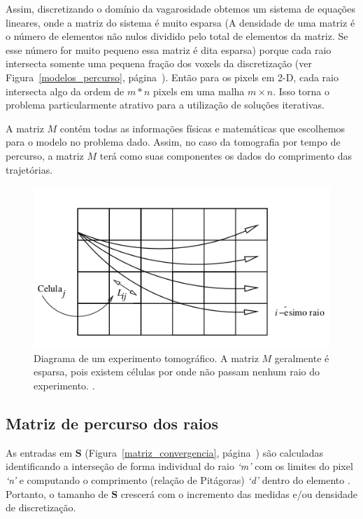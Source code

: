 \documentclass[a4paper, 12 pt]{article} %
\begin{document}
Assim, discretizando o domínio da vagarosidade obtemos um sistema de equações lineares, onde a matriz do sistema é muito esparsa (A densidade de uma matriz é o número de elementos não nulos dividido pelo total de elementos da matriz. Se esse número for muito pequeno essa matriz é dita esparsa) porque cada raio intersecta somente uma pequena fração dos voxels da discretização (ver Figura~\ref{modelos_percurso}, página~\pageref{modelos_percurso}). Então para os pixels em 2-D, cada raio intersecta algo da ordem de $m * n$ pixels em uma malha $m \times n$. Isso torna o problema particularmente atrativo para a utilização de soluções iterativas. 

A matriz $M$ contém todas as informações físicas e matemáticas que escolhemos para o modelo no problema dado. Assim, no caso da tomografia por tempo de percurso, a matriz
$M$ terá como suas componentes os dados do comprimento das trajetórias.

\begin{figure}[!hbtp]
	\begin{center}
		\includegraphics[scale=0.60]{Figuras/diagrama.png}
	\end{center}
	\caption{Diagrama de um experimento tomográfico. A matriz $M$ geralmente é esparsa, pois existem células por onde não passam nenhum raio do experimento. \cite{tempopercurso}.}
	\label{modelos_diagrama}
\end{figure} \newpage


\subsection{Matriz de percurso dos raios}

As entradas em $\textbf{S}$ (Figura~\ref{matriz_convergencia}, página~\pageref{matriz_convergencia}) são calculadas identificando a interseção de forma individual do raio \textit{`m'} com os limites do pixel \textit{`n'} e computando o comprimento (relação de Pitágoras) \textit{`d'} dentro do elemento \citep{RBGf1495}. Portanto, o tamanho de $\textbf{S}$ crescerá com o incremento das medidas e/ou densidade de discretização.
\end{document}
